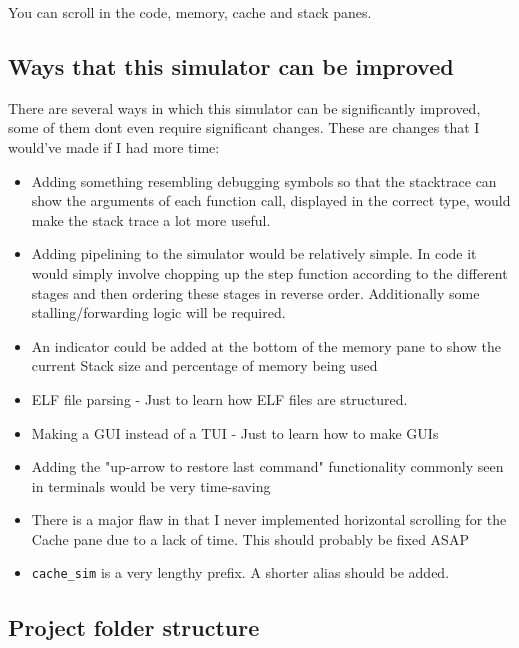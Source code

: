\documentclass[12pt]{article}
\begin{document}
	You can scroll in the code, memory, cache and stack panes.

	\subsection{Ways that this simulator can be improved}

	There are several ways in which this simulator can be significantly improved, some of them dont even require significant changes. These are changes that I would've made if I had more time:

	\begin{itemize}
		\item Adding something resembling debugging symbols so that the stacktrace can show the arguments of each function call, displayed in the correct type, would make the stack trace a lot more useful.
		\item Adding pipelining to the simulator would be relatively simple. In code it would simply involve chopping up the step function according to the different stages and then ordering these stages in reverse order. Additionally some stalling/forwarding logic will be required.
		\item An indicator could be added at the bottom of the memory pane to show the current Stack size and percentage of memory being used
		\item ELF file parsing - Just to learn how ELF files are structured.
		\item Making a GUI instead of a TUI - Just to learn how to make GUIs
		\item Adding the "up-arrow to restore last command" functionality commonly seen in terminals would be very time-saving
		\item There is a major flaw in that I never implemented horizontal scrolling for the Cache pane due to a lack of time. This should probably be fixed ASAP
		\item \verb|cache_sim| is a very lengthy prefix. A shorter alias should be added. 
	\end{itemize}

	\newpage
	\subsection{Project folder structure}
	
\end{document}
